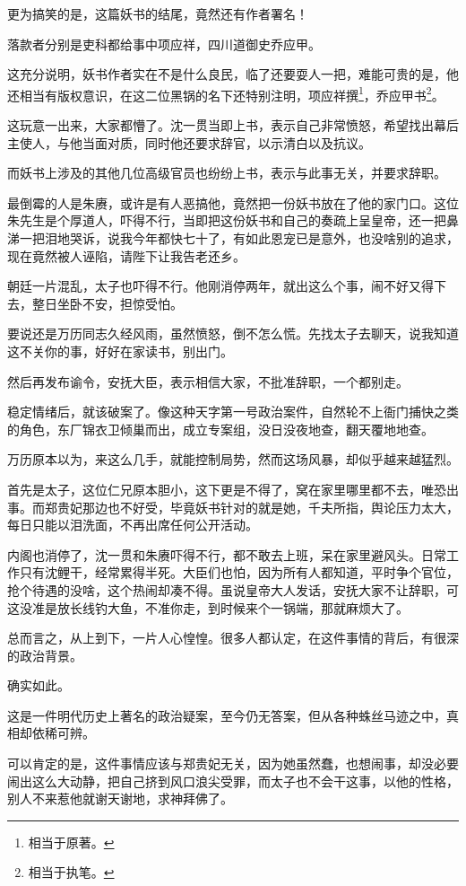\begin{multicols}{\theparacolNo}
		更为搞笑的是，这篇妖书的结尾，竟然还有作者署名！

		落款者分别是吏科都给事中项应祥，四川道御史乔应甲。

		这充分说明，妖书作者实在不是什么良民，临了还要耍人一把，难能可贵的是，他还相当有版权意识，在这二位黑锅的名下还特别注明，项应祥撰\footnote{相当于原著。}，乔应甲书\footnote{相当于执笔。}。

		这玩意一出来，大家都懵了。沈一贯当即上书，表示自己非常愤怒，希望找出幕后主使人，与他当面对质，同时他还要求辞官，以示清白以及抗议。

		而妖书上涉及的其他几位高级官员也纷纷上书，表示与此事无关，并要求辞职。

		最倒霉的人是朱赓，或许是有人恶搞他，竟然把一份妖书放在了他的家门口。这位朱先生是个厚道人，吓得不行，当即把这份妖书和自己的奏疏上呈皇帝，还一把鼻涕一把泪地哭诉，说我今年都快七十了，有如此恩宠已是意外，也没啥别的追求，现在竟然被人诬陷，请陛下让我告老还乡。

		朝廷一片混乱，太子也吓得不行。他刚消停两年，就出这么个事，闹不好又得下去，整日坐卧不安，担惊受怕。

		要说还是万历同志久经风雨，虽然愤怒，倒不怎么慌。先找太子去聊天，说我知道这不关你的事，好好在家读书，别出门。

		然后再发布谕令，安抚大臣，表示相信大家，不批准辞职，一个都别走。

		稳定情绪后，就该破案了。像这种天字第一号政治案件，自然轮不上衙门捕快之类的角色，东厂锦衣卫倾巢而出，成立专案组，没日没夜地查，翻天覆地地查。

		万历原本以为，来这么几手，就能控制局势，然而这场风暴，却似乎越来越猛烈。

		首先是太子，这位仁兄原本胆小，这下更是不得了，窝在家里哪里都不去，唯恐出事。而郑贵妃那边也不好受，毕竟妖书针对的就是她，千夫所指，舆论压力太大，每日只能以泪洗面，不再出席任何公开活动。

		内阁也消停了，沈一贯和朱赓吓得不行，都不敢去上班，呆在家里避风头。日常工作只有沈鲤干，经常累得半死。大臣们也怕，因为所有人都知道，平时争个官位，抢个待遇的没啥，这个热闹却凑不得。虽说皇帝大人发话，安抚大家不让辞职，可这没准是放长线钓大鱼，不准你走，到时候来个一锅端，那就麻烦大了。

		总而言之，从上到下，一片人心惶惶。很多人都认定，在这件事情的背后，有很深的政治背景。

		确实如此。

		这是一件明代历史上著名的政治疑案，至今仍无答案，但从各种蛛丝马迹之中，真相却依稀可辨。

		可以肯定的是，这件事情应该与郑贵妃无关，因为她虽然蠢，也想闹事，却没必要闹出这么大动静，把自己挤到风口浪尖受罪，而太子也不会干这事，以他的性格，别人不来惹他就谢天谢地，求神拜佛了。


\end{multicols}
